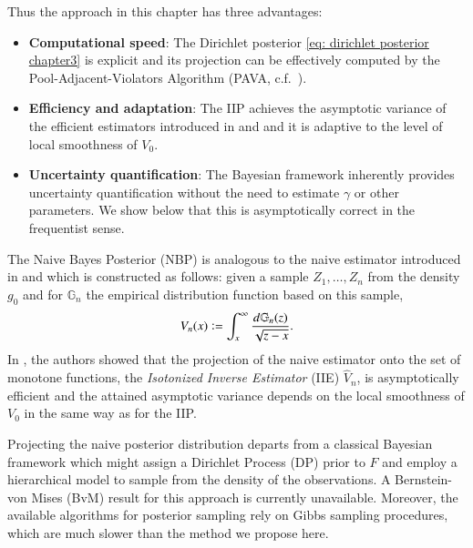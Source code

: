 Thus the approach in this chapter has three advantages:
\begin{itemize}
	\item[(i)] \textbf{Computational speed}: The Dirichlet posterior \eqref{eq: dirichlet posterior chapter3} is explicit and its projection can be effectively computed by the Pool-Adjacent-Violators Algorithm (PAVA, c.f.\ \cite{61}).  
	\item[(ii)]  \textbf{Efficiency and adaptation}: The IIP achieves the asymptotic variance of the efficient estimators introduced in \cite{27} and \cite{10} and it is adaptive to the level of local smoothness of $V_0$.
	\item[(iii)] \textbf{Uncertainty quantification}: The Bayesian framework inherently provides uncertainty quantification without the need to estimate \( \gamma \) or other parameters. We show below that this is asymptotically correct in the frequentist sense.
\end{itemize}

The Naive Bayes Posterior (NBP) is analogous to the naive estimator introduced in \cite{1} and \cite{15} which is constructed as follows: given a sample $Z_1, \ldots, Z_n$ from the density $g_0$ and for $\mathbb{G}_n$ the empirical distribution function based on this sample,
\begin{align}\label{eq: naive estimator of V chapter3}
    V_n(x) \vcentcolon=\int_x^{\infty} \frac{d\mathbb{G}_n(z)}{\sqrt{z-x}}.
\end{align}
In \cite{27}, the authors showed that the projection of the naive estimator onto the set of monotone functions, the \textit{Isotonized Inverse Estimator} (IIE) $\hat{V}_n$, is asymptotically efficient and the attained asymptotic variance depends on the local smoothness of $V_0$ in the same way as for the IIP.

Projecting the naive posterior distribution departs from a classical Bayesian framework which might assign a Dirichlet Process (DP) prior to \( F \) and employ a hierarchical model to sample from the density of the observations. A Bernstein-von Mises (BvM) result for this approach is currently unavailable. Moreover, the available algorithms for posterior sampling rely on Gibbs sampling procedures, which are much slower than the method we propose here. 

